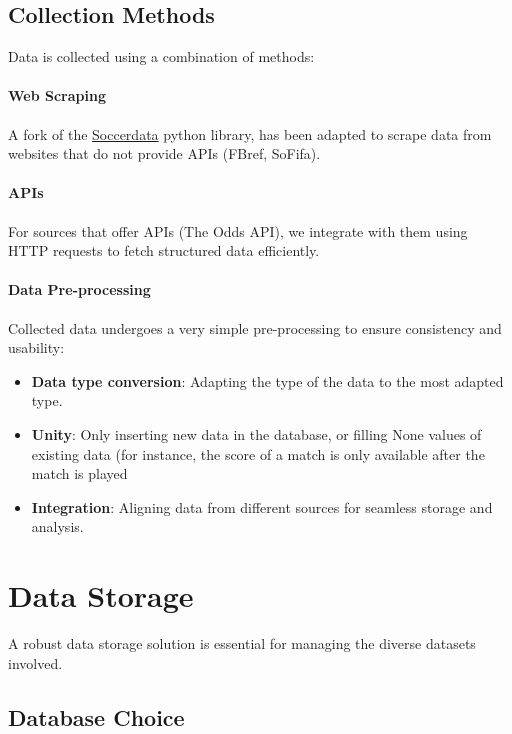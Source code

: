 \subsection{Collection Methods}

Data is collected using a combination of methods:

\paragraph{Web Scraping}

A fork of the \hyperlink{https://soccerdata.readthedocs.io/en/latest/}{Soccerdata} python library, has been adapted to scrape data from websites that do not provide APIs (FBref, SoFifa). 

\paragraph{APIs}

For sources that offer APIs (The Odds API), we integrate with them using HTTP requests to fetch structured data efficiently.

\paragraph{Data Pre-processing}

Collected data undergoes a very simple pre-processing to ensure consistency and usability:

\begin{itemize}
    \item \textbf{Data type conversion}: Adapting the type of the data to the most adapted type.
    \item \textbf{Unity}: Only inserting new data in the database, or filling None values of existing data (for instance, the score of a match is only available after the match is played 
    \item \textbf{Integration}: Aligning data from different sources for seamless storage and analysis.
\end{itemize}

\section{Data Storage}

A robust data storage solution is essential for managing the diverse datasets involved.

\subsection{Database Choice}


